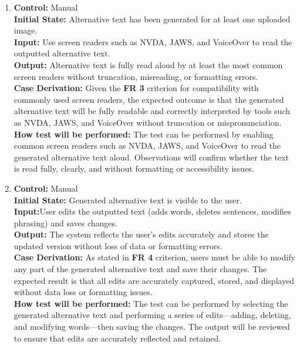 \documentclass[12pt, titlepage]{article}
\begin{document}
\begin{enumerate}[label=FR-ST \arabic*., wide=0pt, leftmargin=*]
  \item{}
    {\bf Control:} Manual\\
    {\bf Initial State:} Alternative text has been generated for at
    least one uploaded image.\\
    {\bf Input:} Use screen readers such as NVDA, JAWS, and VoiceOver
    to read the outputted alternative text.\\
    {\bf Output:} Alternative text is fully read aloud by at least
    the most common screen readers without truncation, misreading, or
    formatting errors. \\
    {\bf  Case Derivation:} Given the \textbf{FR 3} criterion for
    compatibility with commonly used screen readers, the expected
    outcome is that the generated alternative text will be fully
    readable and correctly interpreted by tools such as NVDA, JAWS,
    and VoiceOver without truncation or mispronunciation.\\
    {\bf How test will be performed:} The test can be performed by
    enabling common screen readers such as NVDA, JAWS, and VoiceOver
    to read the generated alternative text aloud. Observations will
    confirm whether the text is read fully, clearly, and without
    formatting or accessibility issues.\\

  \item{}
    {\bf Control:} Manual\\
    {\bf Initial State:} Generated alternative text is visible to the user.\\
    {\bf Input:}User edits the outputted text (adds words, deletes
    sentences, modifies phrasing) and saves changes. \\
    {\bf Output:} The system reflects the user’s edits accurately and
    stores the updated version without loss of data or formatting errors.\\
    {\bf  Case Derivation:} As stated in \textbf{FR 4} criterion,
    users must be able to modify any part of the generated
    alternative text and save their changes. The expected result is
    that all edits are accurately captured, stored, and displayed
    without data loss or formatting issues.\\
    {\bf How test will be performed:} The test can be performed by
    selecting the generated alternative text and performing a series
    of edits—adding, deleting, and modifying words—then saving the
    changes. The output will be reviewed to ensure that edits are
    accurately reflected and retained.\\


\end{enumerate}
\end{document}
